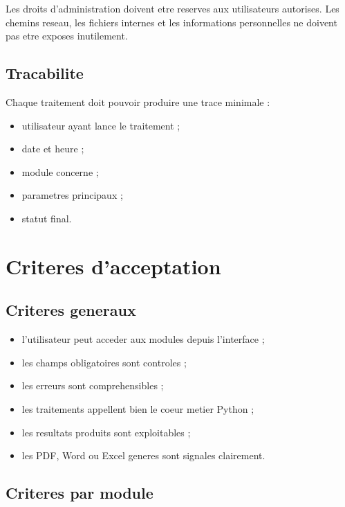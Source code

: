 \documentclass[11pt,a4paper]{report}
\begin{document}
Les droits d'administration doivent etre reserves aux utilisateurs autorises. Les chemins reseau, les fichiers internes et les informations personnelles ne doivent pas etre exposes inutilement.

\section{Tracabilite}

Chaque traitement doit pouvoir produire une trace minimale :

\begin{itemize}
  \item utilisateur ayant lance le traitement ;
  \item date et heure ;
  \item module concerne ;
  \item parametres principaux ;
  \item statut final.
\end{itemize}

\chapter{Criteres d'acceptation}

\section{Criteres generaux}

\begin{itemize}
  \item l'utilisateur peut acceder aux modules depuis l'interface ;
  \item les champs obligatoires sont controles ;
  \item les erreurs sont comprehensibles ;
  \item les traitements appellent bien le coeur metier Python ;
  \item les resultats produits sont exploitables ;
  \item les PDF, Word ou Excel generes sont signales clairement.
\end{itemize}

\section{Criteres par module}
\end{document}
